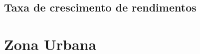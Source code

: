 \documentclass[10pt]{beamer}
\begin{document}
\begin{frame}
\textit{\hyperlink{indice_principal_amz}{}}

\end{frame}


\begin{frame}
\textit{\hyperlink{indice_principal_amz}{}}

\end{frame}

\subsection{Taxa de crescimento de rendimentos}

\begin{frame}
\textit{\hyperlink{indice_principal_amz}{}}

\end{frame}


\begin{frame}
\textit{\hyperlink{indice_principal_amz}{}}

\end{frame}


\begin{frame}
\textit{\hyperlink{indice_principal_amz}{}}

\end{frame}

\section{Zona Urbana}
\end{document}
